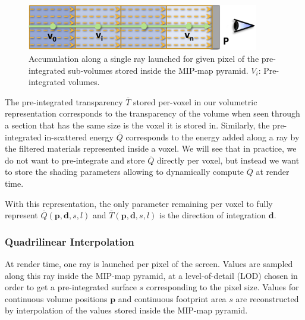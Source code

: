 \begin{figure}\label{f:vct-pre-integration-3}
	\begin{center}
		\includegraphics[width=0.9\textwidth]{graphics/vct/vct-7-3}
	\end{center}
	\caption{Accumulation along a single ray launched for given pixel of the pre-integrated sub-volumes stored inside the MIP-map pyramid. $V_i$: Pre-integrated volumes.}
\end{figure}

The pre-integrated transparency $\overline{T}$ stored per-voxel in our volumetric representation corresponds to the transparency of the volume when seen through a section that has the same size is the voxel it is stored in. Similarly, the pre-integrated in-scattered energy $\overline{Q}$ corresponds to the energy added along a ray by the filtered materials represented inside a voxel. We will see that in practice, we do not want to pre-integrate and store $\overline{Q}$ directly per voxel, but instead we want to store the shading parameters allowing to dynamically compute $\overline{Q}$ at render time.

With this representation, the only parameter remaining per voxel to fully represent $\overline{Q}(\mathbf{p},\mathbf{d},s,l)$ and $\overline{T}(\mathbf{p},\mathbf{d},s,l)$ is the direction of integration $\mathbf{d}$.



\subsubsection{Quadrilinear Interpolation}
At render time, one ray is launched per pixel of the screen. Values are sampled along this ray inside the MIP-map pyramid, at a level-of-detail (LOD) chosen in order to get a pre-integrated surface $s$ corresponding to the pixel size. Values for continuous volume positions $\mathbf{p}$ and continuous footprint area $s$  are reconstructed by interpolation of the values stored inside the MIP-map pyramid. 

